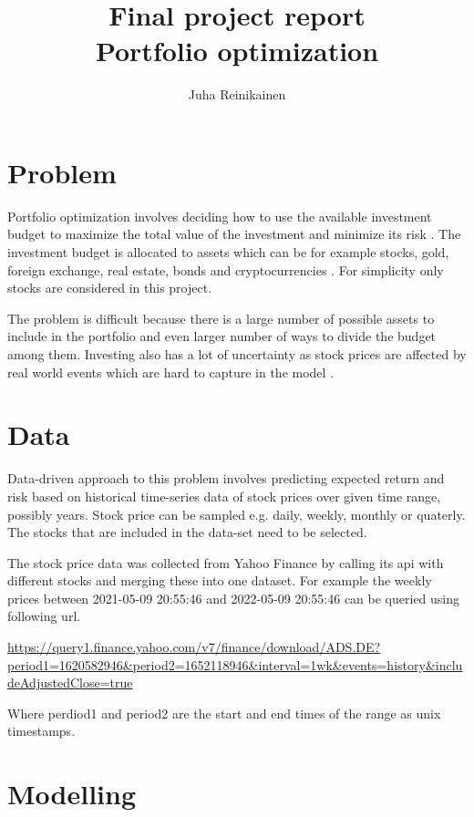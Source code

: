 \documentclass[11pt]{article} %
\title{Final project report\\
	   Portfolio optimization}
\author{Juha Reinikainen}
\begin{document}
\maketitle

\section{Problem}

Portfolio optimization involves deciding how to use the available investment budget to maximize the total value of the investment and minimize its risk \cite{van2021parden}. The investment budget is allocated to assets which can be for example stocks, gold, foreign exchange, real estate, bonds and cryptocurrencies \cite{faizan2019multiobjective}. For simplicity only stocks are considered in this project.

The problem is difficult because there is a large number of possible assets to include in the portfolio and even larger number of ways to divide the budget among them. Investing also has a lot of uncertainty as stock prices are affected by real world events which are hard to capture in the model \cite{du2020new}.

\section{Data}

Data-driven approach to this problem involves predicting expected return and risk based on historical time-series data of stock prices over given time range, possibly years. Stock price can be sampled e.g. daily, weekly, monthly or quaterly. The stocks that are included in the data-set need to be selected.

The stock price data was collected from Yahoo Finance by calling its api with different stocks and merging these into one dataset. For example the weekly prices between 2021-05-09 20:55:46 and 2022-05-09 20:55:46 can be queried using following url.

\url{https://query1.finance.yahoo.com/v7/finance/download/ADS.DE?period1=1620582946&period2=1652118946&interval=1wk&events=history&includeAdjustedClose=true}

Where perdiod1 and period2 are the start and end times of the range as unix timestamps. 

\section{Modelling}
\end{document}
